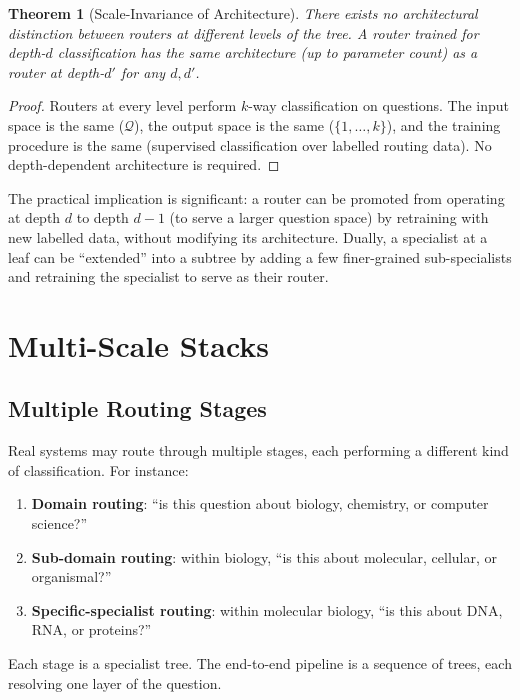 \documentclass[11pt,a4paper]{article}
\newtheorem{theorem}{Theorem}[section]
\theoremstyle{definition}
\theoremstyle{remark}
\newcommand{\Qc}{\mathcal{Q}}
\begin{document}
\begin{theorem}[Scale-Invariance of Architecture]
\label{thm:scale-inv}
There exists no architectural distinction between routers at different levels of the tree. A router trained for depth-$d$ classification has the same architecture (up to parameter count) as a router at depth-$d'$ for any $d, d'$.
\end{theorem}

\begin{proof}
Routers at every level perform $k$-way classification on questions. The input space is the same ($\Qc$), the output space is the same ($\{1, \ldots, k\}$), and the training procedure is the same (supervised classification over labelled routing data). No depth-dependent architecture is required.
\end{proof}

The practical implication is significant: a router can be promoted from operating at depth $d$ to depth $d-1$ (to serve a larger question space) by retraining with new labelled data, without modifying its architecture. Dually, a specialist at a leaf can be ``extended'' into a subtree by adding a few finer-grained sub-specialists and retraining the specialist to serve as their router.

\section{Multi-Scale Stacks}
\label{sec:multi-scale}

\subsection{Multiple Routing Stages}

Real systems may route through multiple stages, each performing a different kind of classification. For instance:
\begin{enumerate}
    \item \textbf{Domain routing}: ``is this question about biology, chemistry, or computer science?''
    \item \textbf{Sub-domain routing}: within biology, ``is this about molecular, cellular, or organismal?''
    \item \textbf{Specific-specialist routing}: within molecular biology, ``is this about DNA, RNA, or proteins?''
\end{enumerate}

Each stage is a specialist tree. The end-to-end pipeline is a sequence of trees, each resolving one layer of the question.
\end{document}
